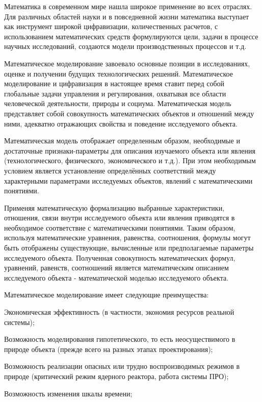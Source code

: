 
Математика в современном мире нашла широкое применение во всех отраслях. Для различных областей науки и в повседневной жизни математика выступает как инструмент широкой цифравизации, количественных расчетов, с использованием математических средств формулируются цели, задачи в процессе научных исследований, создаются модели производственных процессов и т.д.


Математическое моделирование завоевало основные позиции в исследованиях, оценке и получении будущих технологических решений. Математическое моделирование и цифравизация в настоящее время ставит перед собой глобальные задачи управления и регулирования, охватывая все области человеческой деятельности, природы и социума.
Математическая модель представляет собой совокупность математических объектов и отношений между ними, адекватно отражающих свойства и поведение исследуемого объекта.


Математическая модель отображает определенным образом, необходимые и достаточные признаки-параметры для описания изучаемого объекта или явления (технологического, физического, экономического и т.д.). При этом необходимым условием является установление определённых соответствий между характерными параметрами исследуемых объектов, явлений с математическими понятиями. 


Применяя математическую формализацию выбранные характеристики, отношения, связи внутри исследуемого объекта или явления приводятся в необходимое соответствие с математическими понятиями. Таким образом, используя математические уравнения, равенства, соотношения, формулы могут быть отображены существующие, вычисленные или предполагаемые параметры исследуемого объекта. Полученная совокупность математических формул, уравнений, равенств, соотношений является математическим описанием исследуемого объекта -  математической моделью исследуемого объекта. 


 Математическое моделирование имеет следующие преимущества: 
 
 
Экономическая эффективность (в частности, экономия ресурсов реальной системы);

Возможность моделирования гипотетического, то есть неосуществимого в природе объекта (прежде всего на разных этапах проектирования);


Возможность реализации опасных или трудно воспроизводимых режимов в природе (критический режим ядерного реактора, работа системы ПРО);


Возможность изменения шкалы времени; 

